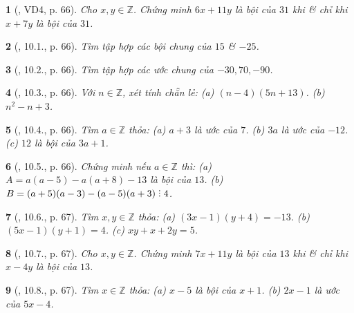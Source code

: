 \documentclass{article}
\newtheorem{baitoan}{}
\DeclareRobustCommand{\divby}{%
	\mathrel{\vbox{\baselineskip.65ex\lineskiplimit0pt\hbox{.}\hbox{.}\hbox{.}}}%
}
\begin{document}
\begin{baitoan}[\cite{Binh_boi_duong_Toan_6_tap_1}, VD4, p. 66]
	Cho $x,y\in\mathbb{Z}$. Chứng minh $6x + 11y$ là bội của $31$ khi \& chỉ khi $x + 7y$ là bội của $31$.
\end{baitoan}

\begin{baitoan}[\cite{Binh_boi_duong_Toan_6_tap_1}, 10.1., p. 66]
	Tìm tập hợp các bội chung của $15$ \& $-25$.
\end{baitoan}

\begin{baitoan}[\cite{Binh_boi_duong_Toan_6_tap_1}, 10.2., p. 66]
	Tìm tập hợp các ước chung của $-30,70,-90$.
\end{baitoan}

\begin{baitoan}[\cite{Binh_boi_duong_Toan_6_tap_1}, 10.3., p. 66]
	Với $n\in\mathbb{Z}$, xét tính chẵn lẻ: (a) $(n - 4)(5n + 13)$. (b) $n^2 - n + 3$.
\end{baitoan}

\begin{baitoan}[\cite{Binh_boi_duong_Toan_6_tap_1}, 10.4., p. 66]
	Tìm $a\in\mathbb{Z}$ thỏa: (a) $a + 3$ là ước của $7$. (b) $3a$ là ước của $-12$. (c) $12$ là bội của $3a + 1$.
\end{baitoan}

\begin{baitoan}[\cite{Binh_boi_duong_Toan_6_tap_1}, 10.5., p. 66]
	Chứng minh nếu $a\in\mathbb{Z}$ thì: (a) $A = a(a - 5) - a(a + 8) - 13$ là bội của $13$. (b) $B = (a + 5)(a - 3) - (a - 5)(a + 3)\divby4$.
\end{baitoan}

\begin{baitoan}[\cite{Binh_boi_duong_Toan_6_tap_1}, 10.6., p. 67]
	Tìm $x,y\in\mathbb{Z}$ thỏa: (a) $(3x - 1)(y + 4) = -13$. (b) $(5x - 1)(y + 1) = 4$. (c) $xy + x + 2y = 5$.
\end{baitoan}

\begin{baitoan}[\cite{Binh_boi_duong_Toan_6_tap_1}, 10.7., p. 67]
	Cho $x,y\in\mathbb{Z}$. Chứng minh $7x + 11y$ là bội của $13$ khi \& chỉ khi $x - 4y$ là bội của $13$.
\end{baitoan}

\begin{baitoan}[\cite{Binh_boi_duong_Toan_6_tap_1}, 10.8., p. 67]
	Tìm $x\in\mathbb{Z}$ thỏa: (a) $x - 5$ là bội của $x + 1$. (b) $2x - 1$ là ước của $5x - 4$.
\end{baitoan}
\end{document}
